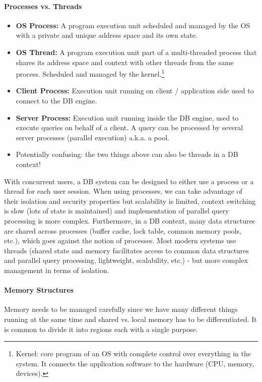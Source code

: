 \paragraph{Processes vs. Threads}
\begin{itemize}
    \item \textbf{OS Process:} A program execution unit scheduled and managed by the OS with a private and unique address space and its own state.
    \item \textbf{OS Thread:} A program execution unit part of a multi-threaded process that shares its address space and context with other threads from the same process. Scheduled and managed by the kernel.\footnote{Kernel: core program of an OS with complete control over everything in the system. It connects the application software to the hardware (CPU, memory, devices).}
    \item \textbf{Client Process:} Execution unit running on client / application side used to connect to the DB engine.
    \item \textbf{Server Process:} Execution unit running inside the DB engine, used to execute queries on behalf of a client. A query can be processed by several server processes (parallel execution) a.k.a. a pool.
    \item Potentially confusing: the two things above can also be threads in a DB context!
\end{itemize}

With concurrent users, a DB system can be designed to either use a process or a thread for each user session. When using processes, we can take advantage of their isolation and security properties but scalability is limited, context switching is slow (lots of state is maintained) and implementation of parallel query processing is more complex. Furthermore, in a DB context, many data structures are shared across processes (buffer cache, lock table, common memory pools, etc.), which goes against the notion of processes. Most modern systems use threads (shared state and memory facilitates access to common data structures and parallel query processing, lightweight, scalability, etc.) - but more complex management in terms of isolation.


\paragraph{Memory Structures}
Memory needs to be managed carefully since we have many different things running at the same time and shared vs. local memory has to be differentiated. It is common to divide it into regions each with a single purpose.

